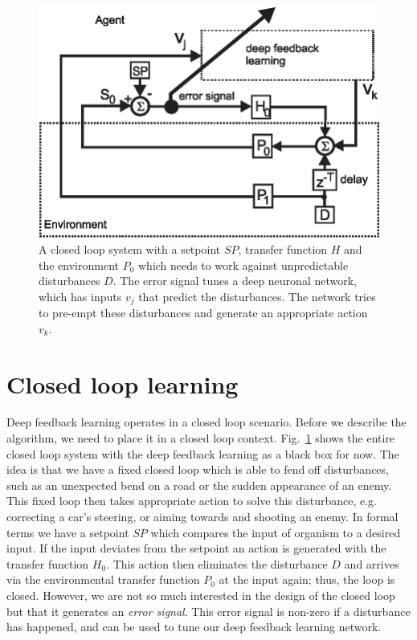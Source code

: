 \documentclass{llncs}
\begin{document}
\begin{figure}[h!]
  \centering
  \includegraphics[width=0.75\columnwidth]{closed_loop}
  \caption{A closed loop system with a setpoint $SP$, transfer function $H$ and the
    environment $P_0$ which needs to work against unpredictable disturbances $D$.
    The error signal tunes a deep neuronal network, which has inputs
    $v_j$ that predict the disturbances. The network tries to pre-empt these
    disturbances and generate an appropriate action $v_k$.
    \label{closed_loop}}
\end{figure}

\section{Closed loop learning}

Deep feedback learning operates in a closed loop scenario. Before we
describe the algorithm, we need to place it in a closed loop
context. Fig.~\ref{closed_loop} shows the entire closed loop system
with the deep feedback learning as a black box for now. The idea
is that we have a fixed closed loop which is able to fend off
disturbances, such as an unexpected bend on a road or the sudden
appearance of an enemy. This fixed loop then takes appropriate action
to solve this disturbance, e.g. correcting a car's steering, or
aiming towards and shooting an enemy. In formal terms we have a
setpoint $SP$ which compares the input of organism to a desired
input. If the input deviates from the setpoint an action is generated
with the transfer function $H_0$. This action then eliminates the
disturbance $D$ and arrives via the environmental transfer function
$P_0$ at the input again; thus, the loop is closed. However, we are
not so much interested in the design of the closed loop
but that it generates an \textsl{error signal}. This error signal is
non-zero if a disturbance has happened, and can be
used to tune our deep feedback learning network.
\end{document}
